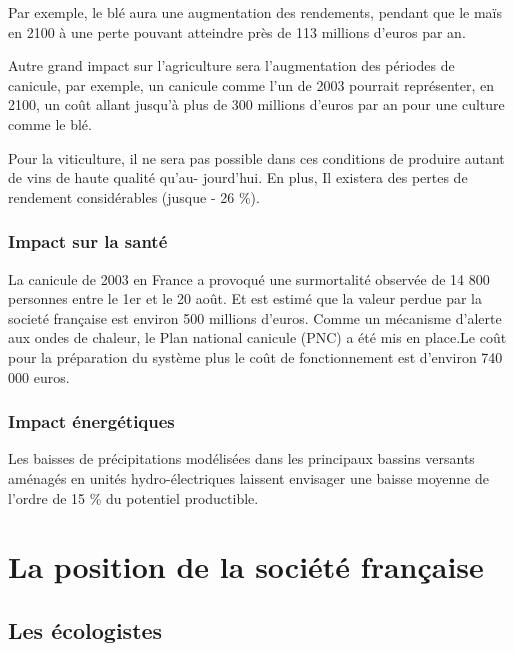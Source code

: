 \documentclass[a4paper,11pt]{article}
\begin{document}
Par exemple, le blé aura une augmentation des rendements, pendant que le maïs en 2100
à une perte pouvant atteindre près de 113 millions d’euros par an.

Autre  grand  impact  sur  l'agriculture  sera l'augmentation  des  périodes  de
canicule, par exemple,  un canicule comme l'un de  2003 pourrait représenter, en
2100,  un coût  allant jusqu’à  plus de  300 millions  d’euros par  an  pour une
culture comme le blé.  

Pour la viticulture, il ne sera pas
possible dans ces conditions de produire autant de vins de haute qualité qu’au-
jourd’hui. En plus, Il existera des pertes de rendement considérables (jusque - 26 \%).

\subsubsection*{Impact sur la santé }
La canicule de 2003 en France a provoqué une surmortalité observée de 14 800
personnes entre le 1er et le 20 août.  Et est estimé que la valeur perdue par la
societé française est environ 500 millions d’euros.
Comme un mécanisme d'alerte aux ondes de chaleur, le Plan national canicule
(PNC) a été mis en place.Le coût  pour la préparation du système plus le coût de
fonctionnement est d'environ 740 000 euros. 

\subsubsection*{Impact énergétiques}

Les baisses de précipitations modélisées dans les principaux bassins versants
aménagés en unités hydro-électriques laissent envisager une baisse moyenne de
l’ordre de 15 \% du potentiel productible.


\section{La position de la société française}
\subsection{Les écologistes}
\end{document}
